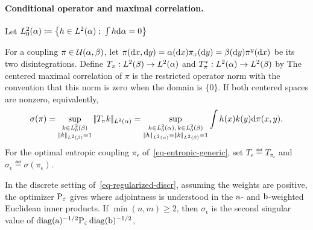 \paragraph{Conditional operator and maximal correlation.}
Let
\(
L_0^2(\al)\eqdef\enscond{h\in L^2(\al)}{\int h\d\al=0}
\)
\begin{defn}\label{def-sinkhorn-conditional-operator}
For a coupling $\pi\in\Couplings(\al,\be)$, let
\(
\pi(\d x,\d y)=\al(\d x)\pi_x(\d y)
=\be(\d y)\pi^y(\d x)
\)
be its two disintegrations. Define
\(
T_\pi:L^2(\be)\to L^2(\al)
\)
and
\(
T_\pi^*:L^2(\al)\to L^2(\be)
\)
by
The centered maximal correlation of $\pi$ is the restricted operator norm
with the convention that this norm is zero when the domain is $\{0\}$. If both centered spaces are nonzero, equivalently,
\[
\sigma(\pi)
=
\sup_{\substack{k\in L_0^2(\be)\\\norm{k}_{L^2(\be)}=1}}
\norm{T_\pi k}_{L^2(\al)}
=
\sup_{\substack{h\in L_0^2(\al),\,k\in L_0^2(\be)\\
\norm{h}_{L^2(\al)}=\norm{k}_{L^2(\be)}=1}}
\int h(x)k(y)\d\pi(x,y).
\]
For the optimal entropic coupling $\pi_\epsilon$ of~\eqref{eq-entropic-generic}, set
\(
T_\epsilon\eqdef T_{\pi_\epsilon}
\)
and
\(
\sigma_\epsilon\eqdef\sigma(\pi_\epsilon).
\)
\end{defn}
In the discrete setting of~\eqref{eq-regularized-discr}, assuming the weights are positive, the optimizer $\P_\epsilon$ gives
where adjointness is understood in the $\a$- and $\b$-weighted Euclidean inner products. If $\min(n,m)\geq2$, then $\sigma_\epsilon$ is the second singular value of
\(
\diag(\a)^{-1/2}\P_\epsilon\diag(\b)^{-1/2}
\),
